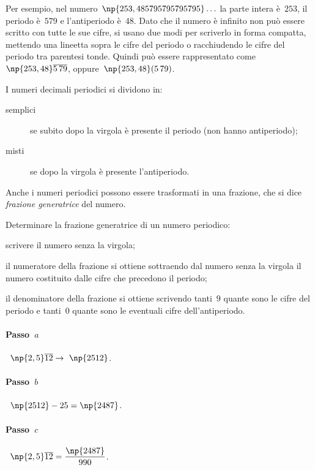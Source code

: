 Per esempio, nel numero~$\np{253,485795795795795}\ldots$ la parte intera è~$253$, il periodo è~$579$ e l'antiperiodo è~$48$.
Dato che il numero è infinito non può essere scritto con tutte le sue cifre, si usano due modi per scriverlo in
forma compatta, mettendo una lineetta sopra le cifre del periodo o racchiudendo le cifre del periodo tra
parentesi tonde. Quindi può essere rappresentato come~$\np{253,48}\overline{5\,79}$, oppure~$\np{253,48}(5\,79)$.

I numeri decimali periodici si dividono in:
\begin{description}
 \item [semplici] se subito dopo la virgola è presente il periodo (non hanno antiperiodo);
 \item [misti] se dopo la virgola è presente l'antiperiodo.
\end{description}

Anche i numeri periodici possono essere trasformati in una frazione, che si
dice \emph{frazione generatrice} del numero.

\begin{procedura}
 Determinare la frazione generatrice di un numero periodico:
\begin{enumeratea}
\item scrivere il numero senza la virgola;
\item il numeratore della frazione si ottiene sottraendo dal numero senza la virgola il numero
	 costituito dalle cifre che precedono il periodo;
\item il denominatore della frazione si ottiene scrivendo tanti~$9$ quante sono le cifre del periodo e
	 tanti~$0$ quante sono le eventuali cifre dell'antiperiodo.
\end{enumeratea}
\end{procedura}

\paragraph*{Passo~$a$}~$\np{2,5}\overline{12}\rightarrow~\np{2512}$.
\paragraph*{Passo~$b$}~$\np{2512}-25=\np{2487}$.
\paragraph*{Passo~$c$}~$\np{2,5}\overline{12}=\dfrac{\np{2487}}{990}$.


